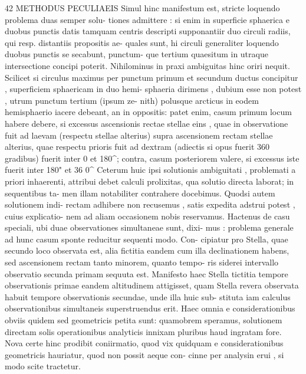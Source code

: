 \documentclass[12pt,a4paper]{article}
\begin{document}
\newpage

42  METHODUS  PECULIAEIS
Simul  hinc  manifestum  est,  stricte  loquendo  problema  duas  semper  solu-
tiones  admittere :  si  enim  in  superficie  sphaerica  e  duobus  punctis  datis  tamquam
centris  descripti  supponantiir  duo  circuli  radiis,  qui  resp.  distantiis  propositis  ae-
quales  sunt,  hi  circuli  generaliter  loquendo  duobus  punctis  se  secabunt,  punctum-
que  tertium  quaesitum  in  utraque  intersectione  concipi  poterit.  Nihilominus  in
praxi  ambiguitas  hinc  oriri  nequit.  Scilicet  si  circulus  maximus  per  punctum
primum  et  secundum  ductus  concipitur ,  superficiem  sphaericam  in  duo  hemi-
sphaeria  dirimens ,  dubium  esse  non  potest ,  utrum  punctum  tertium  (ipsum  ze-
nith)  polusque  arcticus  in  eodem  hemisphaerio  iacere  debeant,  an  in  oppositis:
patet  enim,  casum  primum  locum  habere  debere,  si  excessus  ascensionis  rectae
stellae  eins ,  quae  in  observatione  fuit  ad  laevam  (respectu  stellae  alterius)  supra
ascensionem  rectam  stellae  alterius,  quae  respectu  prioris  fuit  ad  dextram  (adiectis
si  opus  fuerit  360  gradibus)  fuerit  inter  0  et  180\^{};  contra,  casum  posteriorem
valere,  si  excessus  iste  fuerit  inter   180"  et  36  0\^{}
Ceterum  huic  ipsi  solutionis  ambiguitati ,  problemati  a  priori  inhaerenti,
attribui  debet  calculi  prolixitas,  qua  solutio  directa  laborat;  in  sequentibus  ta-
men  illam  notabiliter  contrahere  docebimus.  Quodsi  autem  solutionem  indi-
rectam  adhibere  non  recusemus ,  satis  expedita  adstrui  potest ,  cuius  explicatio-
nem  ad  aliam  occasionem  nobis  reservamus.
Hactenus  de  casu  speciali,  ubi  duae  observationes  simultaneae  sunt,  dixi-
mus :  problema  generale  ad  hunc  casum  sponte  reducitur  sequenti  modo.  Con-
cipiatur  pro  Stella,  quae  secundo  loco  observata  est,  alia  fictitia  eandem  cum  illa
declinationem  habens,  sed  ascensionem  rectam  tanto  minorem,  quanto  tempo-
ris  siderei  intervallo  observatio  secunda  primam  sequuta  est.  Manifesto  haec
Stella  tictitia  tempore  observationis  primae  eandem  altitudinem  attigisset,  quam
Stella  revera  observata  habuit  tempore  observationis  secundae,  unde  illa  huic  sub-
stituta  iam  calculus  observationibus  simultaneis  superstruendus  erit.
Haec  omnia  e  considerationibus  obviis  quidem  sed  geometricis  petita  sunt:
quamobrem  speramus,  solutionem  directam  solis  operationibus  analyticis  innixam
pluribus  haud  ingratam  fore.  Nova  certe  hinc  prodibit  coniirmatio,  quod  vix
quidquam  e  considerationibus  geometricis  hauriatur,  quod  non  possit  aeque  con-
cinne  per  analysin  erui ,   si  modo  scite  tractetur.
\end{document}
